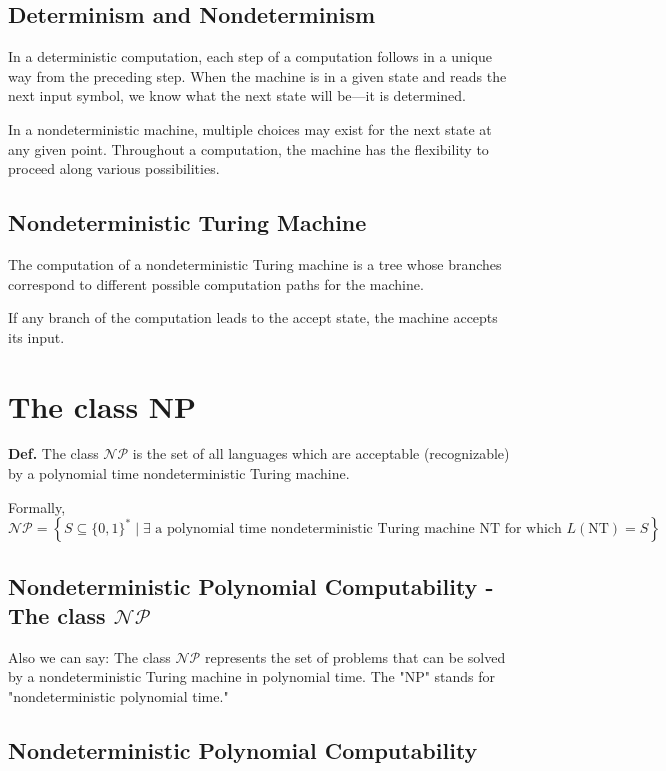 \documentclass[12pt,openany]{book}
\theoremstyle{definition}
\begin{document}
	\subsection{Determinism and Nondeterminism}
	
	In a deterministic computation, each step of a computation follows in a unique way from the preceding step. When the machine is in a given state and reads the next input symbol, we know what the next state will be—it is determined.
	
	In a nondeterministic machine, multiple choices may exist for the next state at any given point. Throughout a computation, the machine has the flexibility to proceed along various possibilities.
	
	\subsection{Nondeterministic Turing Machine}
	
	The computation of a nondeterministic Turing machine is a tree whose branches correspond to different possible computation paths for the machine.
	
	If any branch of the computation leads to the accept state, the machine accepts its input.
	
	\section{The class NP}
	
	\textbf{Def.} The class \( \mathcal{NP} \) is the set of all languages which are acceptable (recognizable) by a polynomial time nondeterministic Turing machine.
	
	Formally,
	\[
	\mathcal{NP} = \left\{ S \subseteq \{0,1\}^* \mid \exists \text{ a polynomial time nondeterministic Turing machine NT for which } L(\text{NT}) = S \right\}
	\]
	
	\subsection{Nondeterministic Polynomial Computability - The class \( \mathcal{NP} \)}
	
	Also we can say: The class \( \mathcal{NP} \) represents the set of problems that can be solved by a nondeterministic Turing machine in polynomial time. The "NP" stands for "nondeterministic polynomial time."
	
	\subsection{Nondeterministic Polynomial Computability}
	
\end{document}
